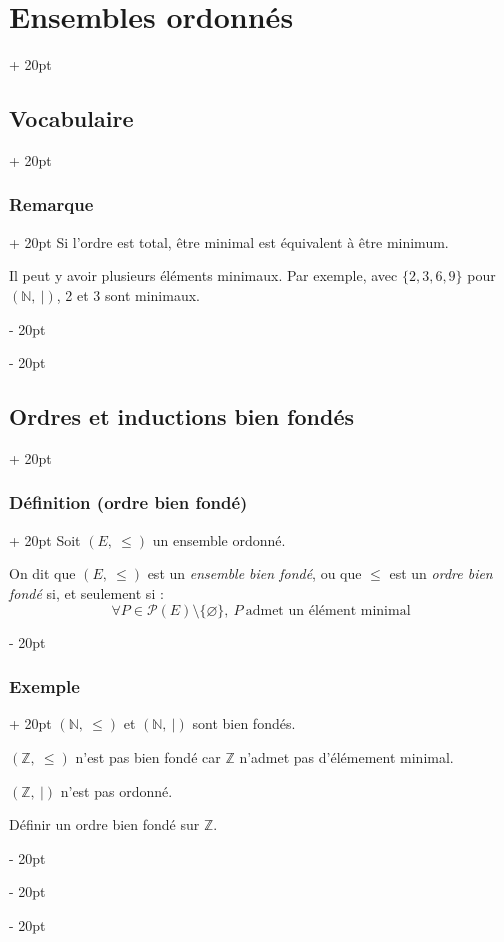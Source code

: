 \documentclass[a4paper, 12pt, twoside]{article}
\newcommand{\N}{\mathbb{N}} %
\newcommand{\Z}{\mathbb{Z}} %
\renewcommand{\le}{\leqslant}
\newcommand{\ind}[1][20pt]{\advance\leftskip + #1}
\newcommand{\deind}[1][20pt]{\advance\leftskip - #1}
\newenvironment{indt}[2][20pt]{#2 \par \ind[#1]}{\par \deind} %
\begin{document}
\begin{indt}{\section{Ensembles ordonnés}}
\begin{indt}{\subsection{Vocabulaire}}
\begin{indt}{\subsubsection{Remarque}}
                Si l'ordre est total, être minimal est équivalent à être minimum.
                
                Il peut y avoir plusieurs éléments minimaux. Par exemple, avec $\{2, 3, 6, 9\}$ pour $(\N,\ |)$, 2 et 3 sont minimaux.
            \end{indt}
        \end{indt}
        
        \vspace{12pt}
        
        \begin{indt}{\subsection{Ordres et inductions bien fondés}}
            \begin{indt}{\subsubsection{Définition (ordre bien fondé)}}
                Soit $(E,\ \le)$ un ensemble ordonné.
                
                On dit que $(E,\ \le)$ est un \textit{ensemble bien fondé}, ou que $\le$ est un \textit{ordre bien fondé} si, et seulement si :
                    \[ \forall P \in \mathcal P(E) \setminus \{ \varnothing \},\ P\ \text{admet un élément minimal} \]
            \end{indt}
            
            \vspace{6pt}
            
            \begin{indt}{\subsubsection{Exemple}}
                $(\N,\ \le)$ et $(\N, \ |)$ sont bien fondés.
                
                $(\Z,\ \le)$ n'est pas bien fondé car $\Z$ n'admet pas d'élémement minimal.
                
                $(\Z,\ |)$ n'est pas ordonné.
                
                \vspace{6pt}
                
                 Définir un ordre bien fondé sur $\Z$.
            \end{indt}
            

\end{indt}
\end{indt}
\end{document}
